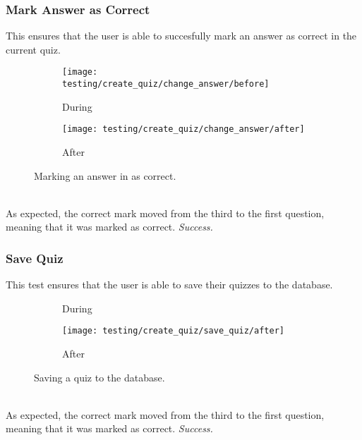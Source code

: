 \subsubsection{Mark Answer as Correct} %
\label{ssub:add_category}
This ensures that the user is able to succesfully mark an answer as correct in the current quiz.
\begin{figure}[!htbp]
\centering
\begin{subfigure}{0.5\textwidth}
  \centering
  \texttt{[image: testing/create\_quiz/change\_answer/before]}
  \caption{During}
  \label{fig:sub1}
\end{subfigure}%
\begin{subfigure}{0.5\textwidth}
  \centering
  \texttt{[image: testing/create\_quiz/change\_answer/after]}
  \caption{After}
  \label{fig:sub2}
\end{subfigure}
\caption{Marking an answer in as correct.}
\label{fig:test}
\end{figure}
\\As expected, the correct mark moved from the third to the first question, meaning that it was marked as correct. \textit{Success.}


\subsubsection{Save Quiz} %
\label{ssub:add_category}
This test ensures that the user is able to save their quizzes to the database.
\begin{figure}[!htbp]
\centering
\begin{subfigure}{0.5\textwidth}
  \centering
  \caption{During}
  \label{fig:sub1}
\end{subfigure}%
\begin{subfigure}{0.5\textwidth}
  \centering
  \texttt{[image: testing/create\_quiz/save\_quiz/after]}
  \caption{After}
  \label{fig:sub2}
\end{subfigure}
\caption{Saving a quiz to the database.}
\label{fig:test}
\end{figure}
\\As expected, the correct mark moved from the third to the first question, meaning that it was marked as correct. \textit{Success.}

